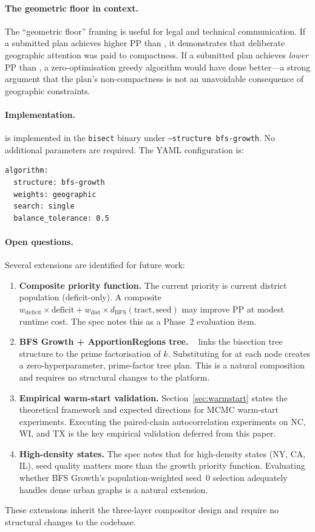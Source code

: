 \paragraph{The geometric floor in context.}
The ``geometric floor'' framing is useful for legal and technical
communication.
If a submitted plan achieves higher PP than \bfsg{}, it demonstrates that
deliberate geographic attention was paid to compactness.
If a submitted plan achieves \emph{lower} PP than \bfsg{}, a zero-optimisation
greedy algorithm would have done better---a strong argument that the plan's
non-compactness is not an unavoidable consequence of geographic constraints.

\paragraph{Implementation.}
\bfsg{} is implemented in the \texttt{bisect} binary under
\texttt{--structure bfs-growth}.
No additional parameters are required.
The YAML configuration is:
\begin{verbatim}
algorithm:
  structure: bfs-growth
  weights: geographic
  search: single
  balance_tolerance: 0.5
\end{verbatim}

\paragraph{Open questions.}
Several extensions are identified for future work:
\begin{enumerate}
\item \textbf{Composite priority function.} The current priority is
  current district population (deficit-only).
  A composite $w_{\mathrm{deficit}} \times \mathrm{deficit} + w_{\mathrm{dist}} \times d_{\mathrm{BFS}}(\mathrm{tract}, \mathrm{seed})$
  may improve PP at modest runtime cost.
  The spec notes this as a Phase~2 evaluation item.

\item \textbf{BFS Growth + ApportionRegions tree.}
  \ar{}~\citep{b11paper} links the bisection tree structure to the
  prime factorisation of $k$.
  Substituting \bfsg{} for \metis{} at each \ar{} node creates a
  zero-hyperparameter, prime-factor tree plan.
  This is a natural composition and requires no structural changes to
  the platform.

\item \textbf{Empirical warm-start validation.}
  Section~\ref{sec:warmstart} states the theoretical framework and
  expected directions for MCMC warm-start experiments.
  Executing the paired-chain autocorrelation experiments on NC, WI, and TX
  is the key empirical validation deferred from this paper.

\item \textbf{High-density states.}
  The spec notes that for high-density states (NY, CA, IL), seed quality
  matters more than the growth priority function.
  Evaluating whether BFS Growth's population-weighted seed~0 selection
  adequately handles dense urban graphs is a natural extension.
\end{enumerate}

These extensions inherit the three-layer compositor design and require no
structural changes to the codebase.
